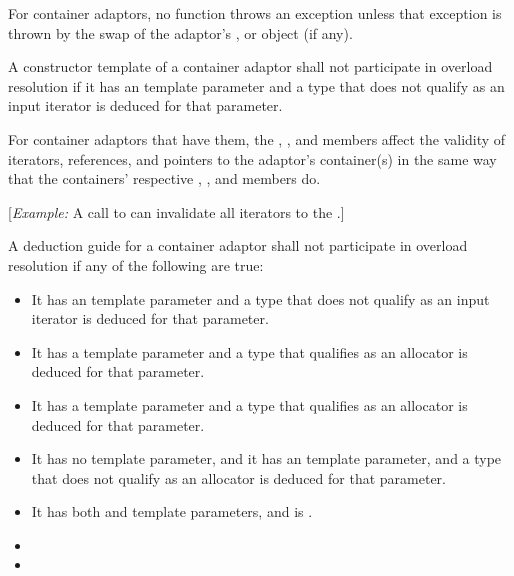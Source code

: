 \pnum
For container adaptors, no  function throws an exception unless
that exception is thrown by the swap of the
adaptor's , or
 object (if any).

\pnum
A constructor template of a container adaptor
shall not participate in overload resolution
if it has an  template parameter and
a type that does not qualify as an input iterator is deduced for that parameter.

\begin{addedblock}
\pnum
For container adaptors that have them, the , ,
and  members affect the validity of iterators, references, and
pointers to the adaptor's container(s) in the same way that the containers'
respective , , and  members do.

[\textit{Example:} A call to  can invalidate all iterators to
the .]
\end{addedblock}

\pnum
A deduction guide for a container adaptor shall not participate in overload resolution if any of the following are true:
\begin{itemize}
\item It has an  template parameter and a type that does not qualify as an input iterator is deduced for that parameter.
\item It has a  template parameter and a type that qualifies as an allocator is deduced for that parameter.
\item It has a  template parameter and a type that qualifies as an allocator is deduced for that parameter.
\item It has no  template parameter, and it has an  template parameter, and a type that does not qualify as an allocator is deduced for that parameter.
\item It has both  and  template parameters, and  is .
\item {}
\item {}
\end{itemize}

